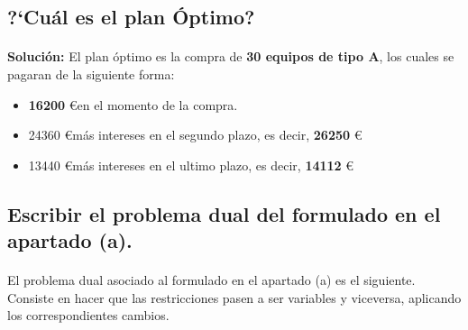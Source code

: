 \documentclass[10pt, a4paper]{article}
\begin{document}
		\subsection{?`Cuál es el plan Óptimo?}

			\paragraph{}
			\textbf{Solución:} El plan óptimo es la compra de \textbf{30 equipos de tipo A}, los cuales se pagaran de la siguiente forma:
			\begin{itemize}
				\item \textbf{16200} \euro en el momento de la compra.
				\item 24360 \euro más intereses en el segundo plazo, es decir, \textbf{26250} \euro
				\item 13440 \euro más intereses en el ultimo plazo, es decir, \textbf{14112} \euro
			\end{itemize}

		\subsection{Escribir el problema dual del formulado en el apartado (a).}

			\paragraph{}
			El problema dual asociado al formulado en el apartado (a) es el siguiente. Consiste en hacer que las restricciones pasen a ser variables y viceversa, aplicando los correspondientes cambios.
\end{document}
